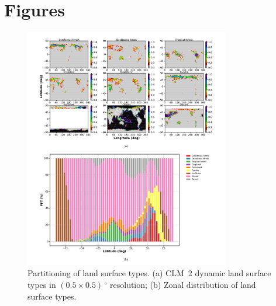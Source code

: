 \documentclass[gmd, manuscript]{copernicus}
\begin{document}
\appendix
\section{Figures}    %
\appendixfigures
\begin{figure}[!htbp]
  \centering
  \includegraphics[width=0.8\textwidth]{fig09}
  \caption{Partitioning of land surface types. (a) CLM~2 dynamic land surface types in $(0.5\times0.5)\,\unit{^\circ}$ resolution; (b) Zonal distribution of land surface types.}
  \label{fig:pft_landsurface}
\end{figure}
\end{document}
